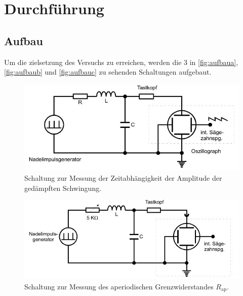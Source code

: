 \section{Durchführung}
\label{sec:Durchführung}
\subsection{Aufbau}
Um die zielsetzung des Versuchs zu erreichen, werden die 3 in \autoref{fig:aufbaua}, \autoref{fig:aufbaub} und \autoref{fig:aufbauc} zu sehenden Schaltungen aufgebaut.
\begin{figure}[H]
    \centering
    \includegraphics[width=\textwidth]{bilder/aufbaua.JPG}
    \caption{Schaltung zur Messung der Zeitabhängigkeit der Amplitude der gedämpften Schwingung. \cite{sample}}
    \label{fig:aufbaua}
  \end{figure}
\noindent

\begin{figure}[H]
    \centering
    \includegraphics[width=\textwidth]{bilder/aufbaub.JPG}
    \caption{Schaltung zur Messung des aperiodischen Grenzwiderstandes $R_{\text{ap}}$. \cite{sample}}
    \label{fig:aufbaub}
  \end{figure}
\noindent

